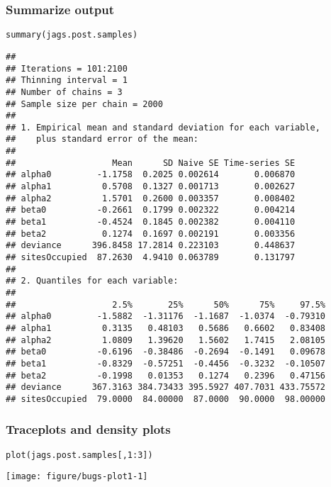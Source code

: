 \documentclass[color=usenames,dvipsnames]{beamer}\usepackage[]{graphicx}\usepackage[]{xcolor}
\makeatletter
\newcommand{\hlnum}[1]{\textcolor[rgb]{0.69,0.494,0}{#1}}%
\newcommand{\hlopt}[1]{\textcolor[rgb]{0,0,0}{#1}}%
\newcommand{\hldef}[1]{\textcolor[rgb]{0,0,0}{#1}}%
\newcommand{\hlkwd}[1]{\textcolor[rgb]{0.004,0.004,0.506}{#1}}%
\newenvironment{kframe}{%
 \def\at@end@of@kframe{}%
 \ifinner\ifhmode%
  \def\at@end@of@kframe{\end{minipage}}%
  \begin{minipage}{\columnwidth}%
 \fi\fi%
 \def\FrameCommand##1{\hskip\@totalleftmargin \hskip-\fboxsep
 \colorbox{shadecolor}{##1}\hskip-\fboxsep
     \hskip-\linewidth \hskip-\@totalleftmargin \hskip\columnwidth}%
 \MakeFramed {\advance\hsize-\width
   \@totalleftmargin\z@ \linewidth\hsize
   \@setminipage}}%
 {\par\unskip\endMakeFramed%
 \at@end@of@kframe}
\newenvironment{knitrout}{}{} %
\makeatother
\begin{document}
\begin{frame}[fragile]
  \frametitle{Summarize output}
\begin{knitrout}\tiny
{}\color{fgcolor}\begin{kframe}
\begin{alltt}
\hlkwd{summary}\hldef{(jags.post.samples)}
\end{alltt}
\begin{verbatim}
## 
## Iterations = 101:2100
## Thinning interval = 1 
## Number of chains = 3 
## Sample size per chain = 2000 
## 
## 1. Empirical mean and standard deviation for each variable,
##    plus standard error of the mean:
## 
##                   Mean      SD Naive SE Time-series SE
## alpha0         -1.1758  0.2025 0.002614       0.006870
## alpha1          0.5708  0.1327 0.001713       0.002627
## alpha2          1.5701  0.2600 0.003357       0.008402
## beta0          -0.2661  0.1799 0.002322       0.004214
## beta1          -0.4524  0.1845 0.002382       0.004110
## beta2           0.1274  0.1697 0.002191       0.003356
## deviance      396.8458 17.2814 0.223103       0.448637
## sitesOccupied  87.2630  4.9410 0.063789       0.131797
## 
## 2. Quantiles for each variable:
## 
##                   2.5%       25%      50%      75%     97.5%
## alpha0         -1.5882  -1.31176  -1.1687  -1.0374  -0.79310
## alpha1          0.3135   0.48103   0.5686   0.6602   0.83408
## alpha2          1.0809   1.39620   1.5602   1.7415   2.08105
## beta0          -0.6196  -0.38486  -0.2694  -0.1491   0.09678
## beta1          -0.8329  -0.57251  -0.4456  -0.3232  -0.10507
## beta2          -0.1998   0.01353   0.1274   0.2396   0.47156
## deviance      367.3163 384.73433 395.5927 407.7031 433.75572
## sitesOccupied  79.0000  84.00000  87.0000  90.0000  98.00000
\end{verbatim}
\end{kframe}
\end{knitrout}
\end{frame}




\begin{frame}[fragile]
  \frametitle{Traceplots and density plots}
\begin{knitrout}\footnotesize
{}\color{fgcolor}\begin{kframe}
\begin{alltt}
\hlkwd{plot}\hldef{(jags.post.samples[,}\hlnum{1}\hlopt{:}\hlnum{3}\hldef{])}
\end{alltt}
\end{kframe}

{\centering \texttt{[image: figure/bugs-plot1-1]} 

}


\end{knitrout}
\end{frame}
\end{document}
